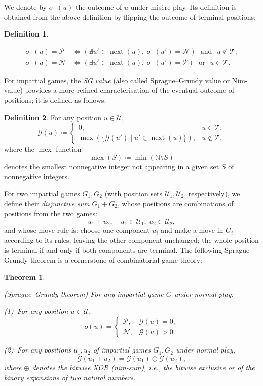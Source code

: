 \documentclass[11pt]{article}
\newtheorem{theorem}{Theorem}[section]
\theoremstyle{definition}
\newtheorem{definition}{Definition}[section]
\theoremstyle{plain}
\newcommand{\varP}{\mathcal{P}}
\newcommand{\varN}{\mathcal{N}}
\newcommand{\varG}{\mathcal{G}}
\newcommand{\varU}{\mathcal{U}}
\newcommand{\varT}{\mathcal{T}}
\newcommand{\nxt}{\operatorname{next}}
\newcommand{\mex}{\operatorname{mex}}
\begin{document}
We denote by $o^-(u)$ the outcome of $u$ under misère play. Its definition is obtained from the above definition by flipping the outcome of terminal positions:

\begin{definition}\label{def:outcome_mis}

    \begin{align*}
        o^-(u)= \varP &\iff (\nexists u'\in \nxt(u),\ o^-(u')=\varN) \text{~~and~~} u\notin \varT; \\
        o^-(u)= \varN &\iff (\exists  u'\in \nxt(u),\ o^-(u')=\varP) \text{~~or~~}  u\in \varT.
    \end{align*}
\end{definition}

For impartial games, the \textit{SG value} (also called Sprague--Grundy value or Nim-value) provides a more refined characterisation of the eventual outcome of positions; it is defined as follows:
\begin{definition}\label{def:SG}
    For any position $u\in\varU$,
    \[
    \varG(u) \coloneq
    \begin{cases}
        0, & u\in\varT;\\
        \mex(\{ \varG(u') \mid u'\in\nxt(u)\}), & u\notin\varT.
    \end{cases}
    \]
    where the $\mex$ function
    \[
        \mex(S) \coloneq \min (\mathbb{N} \setminus S)
    \]
    denotes the smallest nonnegative integer not appearing in a given set $S$ of nonnegative integers.
\end{definition}

For two impartial games $G_1, G_2$ (with position sets $\varU_1, \varU_2$, respectively),
we define their \textit{disjunctive sum} $G_1 + G_2$, whose positions are combinations of positions from the two games:
\[
    u_1 + u_2,\quad u_1\in\varU_1,\ u_2\in\varU_2,
\]
and whose move rule is: choose one component $u_i$ and make a move in $G_i$ according to its rules, leaving the other component unchanged; the whole position is terminal if and only if both components are terminal.
The following Sprague--Grundy theorem is a cornerstone of combinatorial game theory:

\begin{theorem}\label{thr:sg}

    (Sprague--Grundy theorem) For any impartial game $G$ under normal play:

    (1)~For any position $u\in \varU$,
    \[
        o(u) =
        \begin{cases}
            \varP, & \varG(u)=0; \\
            \varN, & \varG(u)>0.
        \end{cases}
    \]

    (2)~For any positions $u_1, u_2$ of impartial games $G_1, G_2$ under normal play,
    \[
        \varG(u_1+u_2) = \varG(u_1) \oplus \varG(u_2),
    \]
    where $\oplus$ denotes the \textit{bitwise XOR} (nim-sum), i.e., the bitwise exclusive or of the binary expansions of two natural numbers.
\end{theorem}
\end{document}
